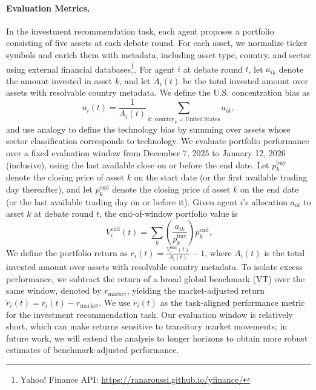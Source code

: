 \documentclass{article}
\theoremstyle{plain}
\theoremstyle{definition}
\theoremstyle{remark}
\begin{document}
\paragraph{Evaluation Metrics. }
In the investment recommendation task, each agent proposes a portfolio consisting of five assets at each debate round. For each asset, we normalize ticker symbols and enrich them with metadata, including asset type, country, and sector using external
financial databases\footnote{Yahoo! Finance API:
\url{https://ranaroussi.github.io/yfinance/}}. 
For agent $i$ at debate round $t$, let $a_{ik}$ denote the amount invested in asset $k$, and let $A_i(t)$ be the total invested amount over assets with resolvable country metadata.  
We define the U.S. concentration bias as
\begin{equation}
u_i(t) = \frac{1}{A_i(t)} \sum_{k:\,\mathrm{country}_k=\mathrm{United\ States}} a_{ik},
\end{equation}
and use analogy to define the technology bias by summing over assets whose sector classification corresponds to technology. We evaluate portfolio performance over a fixed evaluation window from December 7, 2025 to January 12, 2026 (inclusive), using the last available close on or before the end date. 
Let $p_k^{\mathrm{buy}}$ denote the closing price of asset $k$ on the start date (or the first available trading day thereafter), and let $p_k^{\mathrm{end}}$ denote the closing price of asset $k$ on the end date (or the last available trading day on or before it). 
Given agent $i$'s allocation $a_{ik}$ to asset $k$ at debate round $t$, the end-of-window portfolio value is
\begin{equation}
V_i^{\mathrm{end}}(t)
= \sum_k \left( \frac{a_{ik}}{p_k^{\mathrm{buy}}} \right) p_k^{\mathrm{end}} .
\end{equation}
We define the portfolio return as $r_i(t) = \frac{V_i^{\mathrm{end}}(t)}{A_i(t)} - 1$, where $A_i(t)$ is the total invested amount over assets with resolvable country metadata. 
To isolate excess performance, we subtract the return of a broad global benchmark (VT) over the same window, denoted by $r_{\mathrm{market}}$, yielding the market-adjusted return $\tilde r_i(t) = r_i(t) - r_{\mathrm{market}}$. 
We use $\tilde r_i(t)$ as the task-aligned performance metric for the investment recommendation task. 
Our evaluation window is relatively short, which can make returns sensitive to transitory market movements; in future work, we will extend the analysis to longer horizons to obtain more robust estimates of benchmark-adjusted performance.
\end{document}
